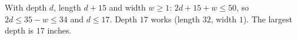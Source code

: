 With depth $d$, length $d+15$ and width $w\ge1$: $2d+15+w\le50$, so $2d\le35-w\le34$ and $d\le17$. Depth $17$ works (length $32$, width $1$). The largest depth is $\boxed{17}$ inches.
